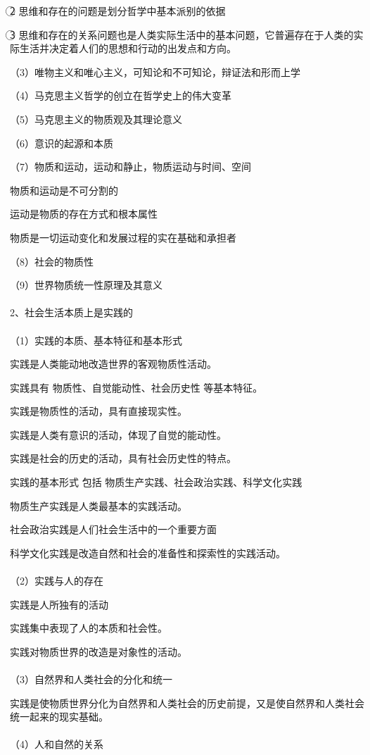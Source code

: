 \documentclass{ctexart}
\begin{document}
\textcircled{2} 思维和存在的问题是划分哲学中基本派别的依据

\textcircled{3} 思维和存在的关系问题也是人类实际生活中的基本问题，它普遍存在于人类的实际生活并决定着人们的思想和行动的出发点和方向。

（3）唯物主义和唯心主义，可知论和不可知论，辩证法和形而上学

（4）马克思主义哲学的创立在哲学史上的伟大变革

（5）马克思主义的物质观及其理论意义

（6）意识的起源和本质

（7）物质和运动，运动和静止，物质运动与时间、空间

物质和运动是不可分割的

运动是物质的存在方式和根本属性

物质是一切运动变化和发展过程的实在基础和承担者

（8）社会的物质性

（9）世界物质统一性原理及其意义
\\\\

2、社会生活本质上是实践的
\\\\
（1）实践的本质、基本特征和基本形式

实践是人类能动地改造世界的客观物质性活动。

实践具有 物质性、自觉能动性、社会历史性 等基本特征。

实践是物质性的活动，具有直接现实性。

实践是人类有意识的活动，体现了自觉的能动性。

实践是社会的历史的活动，具有社会历史性的特点。

实践的基本形式 包括 物质生产实践、社会政治实践、科学文化实践

物质生产实践是人类最基本的实践活动。

社会政治实践是人们社会生活中的一个重要方面

科学文化实践是改造自然和社会的准备性和探索性的实践活动。
\\\\
（2）实践与人的存在

实践是人所独有的活动

实践集中表现了人的本质和社会性。

实践对物质世界的改造是对象性的活动。
\\\\
（3）自然界和人类社会的分化和统一

实践是使物质世界分化为自然界和人类社会的历史前提，又是使自然界和人类社会统一起来的现实基础。
\\\\
（4）人和自然的关系
\end{document}
